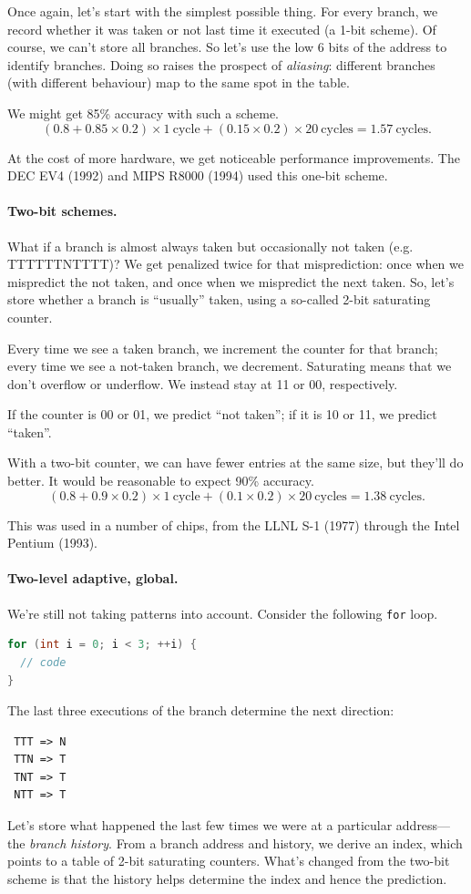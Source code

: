 \documentclass[a4paper]{report}
\begin{document}
Once again, let's start with the simplest possible thing. For every branch,
we record whether it was taken or not last time it executed (a 1-bit scheme).
Of course, we can't store all branches. So let's use the low 6 bits of the address
to identify branches. Doing so raises the prospect of \emph{aliasing}:
different branches (with different behaviour) map to the same spot in the table.

We might get 85\% accuracy with such a scheme.
\[
(0.8 + 0.85 \times 0.2) \times 1 \mathrm{~cycle} + (0.15 \times 0.2) \times 20 \mathrm{~cycles} = 1.57 \mathrm{~cycles}.
\]

At the cost of more hardware, we get noticeable performance improvements. The DEC EV4 (1992) and
MIPS R8000 (1994) used this one-bit scheme.

\paragraph{Two-bit schemes.}
What if a branch is almost always taken but occasionally not taken (e.g. TTTTTTNTTTT)?
We get penalized twice
for that misprediction: once when we mispredict the not taken, and once when we mispredict the
next taken. So, let's store whether a branch is ``usually'' taken, using a so-called
2-bit saturating counter.

Every time we see a taken branch, we increment the counter for that
branch; every time we see a not-taken branch, we decrement. Saturating
means that we don't overflow or underflow. We instead stay at 11 or
00, respectively.

If the counter is 00 or 01, we predict ``not taken''; if it is 10 or
11, we predict ``taken''.

With a two-bit counter, we can have fewer entries at the same size, but they'll do better.
It would be reasonable to expect 90\% accuracy.
\[
(0.8 + 0.9 \times 0.2) \times 1 \mathrm{~cycle} + (0.1 \times 0.2) \times 20 \mathrm{~cycles} = 1.38 \mathrm{~cycles}.
\]

This was used in a number of chips, from the LLNL S-1 (1977) through the Intel Pentium (1993).

\paragraph{Two-level adaptive, global.}
We're still not taking patterns into account. Consider the following {\tt for} loop.
\begin{lstlisting}[language=C]
for (int i = 0; i < 3; ++i) {
  // code
}
\end{lstlisting}
The last three executions of the branch determine the next direction:
\begin{verbatim}
 TTT => N
 TTN => T
 TNT => T
 NTT => T
\end{verbatim}
Let's store what happened the last few times we were at a particular address---the
\emph{branch history}. From a branch address and history, we derive an index, which
points to a table of 2-bit saturating counters. What's changed from the two-bit scheme
is that the history helps determine the index and hence the prediction.
\end{document}
